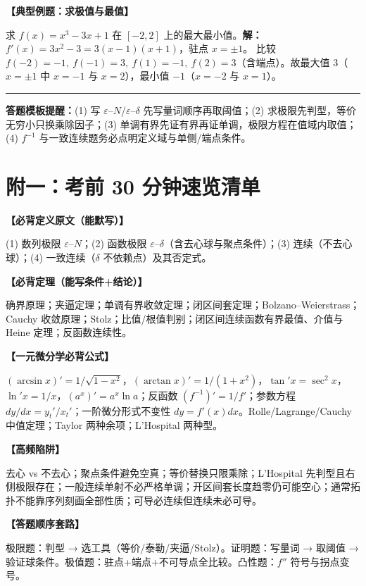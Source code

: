 \documentclass[12pt,a4paper,UTF8]{ctexart}
\newcommand{\eps}{\varepsilon}
\newenvironment{kp}[1]{\par\smallskip\noindent\textbf{【#1】}\par\nobreak\smallskip}{\par\smallskip}
\begin{document}
\begin{kp}{典型例题：求极值与最值}
求 $f(x)=x^3-3x+1$ 在 $[-2,2]$ 上的最大最小值。\textbf{解：}$f'(x)=3x^2-3=3(x-1)(x+1)$，驻点 $x=\pm1$。
比较 $f(-2)=-1,\ f(-1)=3,\ f(1)=-1,\ f(2)=3$（含端点）。故最大值 $3$（$x=\pm1$ 中 $x=-1$ 与 $x=2$），最小值 $-1$（$x=-2$ 与 $x=1$）。
\end{kp}

\vfill
\hrule
\vspace{2pt}
{\footnotesize \textbf{答题模板提醒：}(1) 写 $\eps$–$N$/$\eps$–$\delta$ 先写量词顺序再取阈值；(2) 求极限先判型，等价无穷小只换乘除因子；(3) 单调有界先证有界再证单调，极限方程在值域内取值；(4) ${f^{-1}}$ 与一致连续题务必点明定义域与单侧/端点条件。}

\newpage
\section*{附一：考前 30 分钟速览清单}

\begin{kp}{必背定义原文（能默写）}
(1) 数列极限 $\eps$–$N$；(2) 函数极限 $\eps$–$\delta$（含去心球与聚点条件）；(3) 连续（不去心球）；(4) 一致连续（$\delta$ 不依赖点）及其否定式。
\end{kp}

\begin{kp}{必背定理（能写条件+结论）}
确界原理；夹逼定理；单调有界收敛定理；闭区间套定理；Bolzano--Weierstrass；Cauchy 收敛原理；Stolz；比值/根值判别；闭区间连续函数有界最值、介值与 Heine 定理；反函数连续性。
\end{kp}

\begin{kp}{一元微分学必背公式}
$(\arcsin x)'=1/\sqrt{1-x^2}$，$(\arctan x)'=1/(1+x^2)$，$\tan'x=\sec^2x$，$\ln'x=1/x$，$(a^x)'=a^x\ln a$；反函数 $(f^{-1})'=1/f'$；参数方程 $dy/dx=y_t'/x_t'$；一阶微分形式不变性 $dy=f'(x)dx$。Rolle/Lagrange/Cauchy 中值定理；Taylor 两种余项；L'Hospital 两种型。
\end{kp}

\begin{kp}{高频陷阱}
去心 vs 不去心；聚点条件避免空真；等价替换只限乘除；L'Hospital 先判型且右侧极限存在；一般连续单射不必严格单调；开区间套长度趋零仍可能空心；通常拓扑不能靠序列刻画全部性质；可导必连续但连续未必可导。
\end{kp}

\begin{kp}{答题顺序套路}
极限题：判型 → 选工具（等价/泰勒/夹逼/Stolz）。证明题：写量词 → 取阈值 → 验证球条件。极值题：驻点+端点+不可导点全比较。凸性题：$f''$ 符号与拐点变号。
\end{kp}
\end{document}
